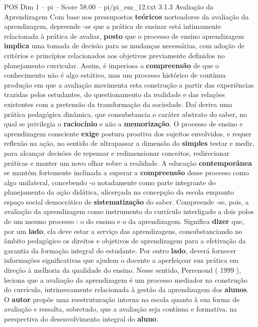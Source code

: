 \begin{textsample}{POS Dim 1 – pi – Score 58.00 – pi/pi\_em\_12.txt}  \label{ex:f1_pos_055}
3.1.3 Avaliação da Aprendizagem Com base nos pressupostos \textbf{teóricos} norteadores da avaliação da aprendizagem, depreende -se que a prática de ensinar está intimamente relacionada à prática de avaliar, \textbf{posto} que o processo de ensino aprendizagem \textbf{implica} uma tomada de decisão para as mudanças necessárias, com adoção de critérios e princípios relacionados aos objetivos previamente definidos no planejamento curricular.
Assim, é imperiosa a \textbf{compreensão} de que o conhecimento não é algo estático, mas um processo histórico de contínua produção em que a avaliação movimenta esta construção a partir das experiências trazidas pelos estudantes, do questionamento da realidade e das relações existentes com a pretensão da transformação da sociedade.
Daí deriva uma prática pedagógica dinâmica, que consubstancia o caráter abstrato do saber, no qual se privilegia o \textbf{raciocínio} e não a \textbf{memorização}.
O processo de ensino e aprendizagem consciente \textbf{exige} postura proativa dos sujeitos envolvidos, e requer reflexão na ação, no sentido de ultrapassar a dimensão do \textbf{simples} testar e medir, para alcançar decisões de repensar e redimensionar conceitos, redirecionar práticas e manter um novo olhar sobre a realidade.
A educação \textbf{contemporânea} se mantém fortemente inclinada a superar a \textbf{compreensão} desse processo como algo unilateral, concebendo -o notadamente como parte integrante do planejamento da ação didática, alicerçada na concepção da escola enquanto espaço social democrático de \textbf{sistematização} do saber.
Compreende -se, pois, a avaliação da aprendizagem como instrumento do currículo interligado a dois polos de um mesmo processo : o do ensino e o da aprendizagem.
Significa \textbf{dizer} que, por um \textbf{lado}, ela deve estar a serviço das aprendizagens, consubstanciando no âmbito pedagógico os direitos e objetivos de aprendizagem para a efetivação da garantia da formação integral do estudante.
Por outro \textbf{lado}, deverá fornecer informações significativas que ajudem o docente a aperfeiçoar sua prática em direção à melhoria da qualidade do ensino.
Nesse sentido, Perrenoud ( 1999 ), leciona que a avaliação da aprendizagem é um processo mediador na construção do currículo, intrinsecamente relacionada à gestão da aprendizagem dos \textbf{alunos}.
O \textbf{autor} propõe uma reestruturação interna na escola quanto à sua forma de avaliação e ressalta, sobretudo, que a avaliação seja contínua e formativa, na perspectiva do desenvolvimento integral do \textbf{aluno}.

\end{textsample}
